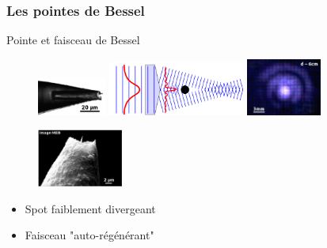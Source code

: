 \documentclass[9pt,a9paper,handout]{beamer}
\begin{document}
    \begin{frame}    
        \frametitle{Les pointes de Bessel}
        {\large Pointe et faisceau de Bessel\\}

        \begin{figure}[H]\centering
            \includegraphics[width=0.20\textwidth]{Images/PhotosPointes/Bessel_1}
            \qquad
            \includegraphics[width=0.40\textwidth]{Images/Schemas/bessel.pdf}
            \qquad
            \includegraphics[width=0.22\textwidth]{Images/PhotosPointes/BesselLoin}
        \end{figure}
        \vspace*{5mm}
        \begin{figure}[H]\flushright
            \includegraphics[width=0.25\textwidth]{Images/PhotosPointes/Bessel_MEB}
        \end{figure}
        
        \vspace*{-15mm}
        \begin{itemize}
            \item Spot faiblement divergeant
            \item Faisceau "auto-régénérant"
        \end{itemize}
        \let\thefootnote\relax{}
    \end{frame}
\end{document}
